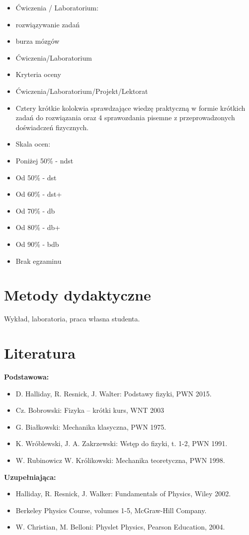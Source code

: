 \documentclass[12pt, a4paper]{article}
\begin{document}
\begin{itemize}
  \item Ćwiczenia / Laboratorium:
  \item rozwiązywanie zadań
  \item burza mózgów
  \item Ćwiczenia/Laboratorium
  \item Kryteria oceny
  \item Ćwiczenia/Laboratorium/Projekt/Lektorat
  \item Cztery krótkie kolokwia sprawdzające wiedzę praktyczną w formie krótkich zadań do rozwiązania oraz 4 sprawozdania pisemne z przeprowadzonych doświadczeń fizycznych.
  \item Skala ocen:
  \item Poniżej 50\% - ndst
  \item Od 50\% - dst
  \item Od 60\% - dst+
  \item Od 70\% - db
  \item Od 80\% - db+
  \item Od 90\% - bdb
  \item Brak egzaminu
\end{itemize}

\section{Metody dydaktyczne}

Wykład, laboratoria, praca własna studenta.

\section{Literatura}

\textbf{Podstawowa:}
\begin{itemize}
  \item D. Halliday, R. Resnick, J. Walter: Podstawy fizyki, PWN 2015.
  \item Cz. Bobrowski: Fizyka – krótki kurs, WNT 2003
  \item G. Białkowski: Mechanika klasyczna, PWN 1975.
  \item K. Wróblewski, J. A. Zakrzewski: Wstęp do fizyki, t. 1-2, PWN 1991.
  \item W. Rubinowicz W. Królikowski: Mechanika teoretyczna, PWN 1998.
\end{itemize}

\textbf{Uzupełniająca:}
\begin{itemize}
  \item Halliday, R. Resnick, J. Walker: Fundamentals of Physics, Wiley 2002.
  \item Berkeley Physics Course, volumes 1-5, McGraw-Hill Company.
  \item W. Christian, M. Belloni: Physlet Physics, Pearson Education, 2004.
\end{itemize}
\end{document}

